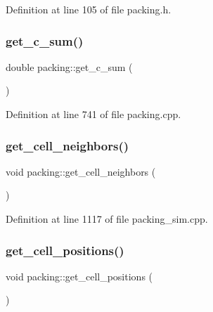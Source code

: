Definition at line 105 of file packing.\+h.

\mbox{\label{classpacking_a23fc5018721f5022318addbe87b33d47}} 
\subsubsection{\texorpdfstring{get\+\_\+c\+\_\+sum()}{get\_c\_sum()}}
{\footnotesize\ttfamily double packing\+::get\+\_\+c\+\_\+sum (\begin{DoxyParamCaption}{ }\end{DoxyParamCaption})}



Definition at line 741 of file packing.\+cpp.

\mbox{\label{classpacking_a51875315e1e8c16a5dfc9e3807fcff17}} 
\subsubsection{\texorpdfstring{get\+\_\+cell\+\_\+neighbors()}{get\_cell\_neighbors()}}
{\footnotesize\ttfamily void packing\+::get\+\_\+cell\+\_\+neighbors (\begin{DoxyParamCaption}{ }\end{DoxyParamCaption})}



Definition at line 1117 of file packing\+\_\+sim.\+cpp.

\mbox{\label{classpacking_ad9908dd91b3969dc8a5de39d8fcf66e3}} 
\subsubsection{\texorpdfstring{get\+\_\+cell\+\_\+positions()}{get\_cell\_positions()}}
{\footnotesize\ttfamily void packing\+::get\+\_\+cell\+\_\+positions (\begin{DoxyParamCaption}{ }\end{DoxyParamCaption})}



